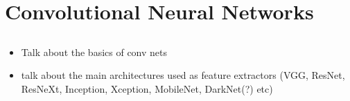 \chapter{Convolutional Neural Networks}
\label{chap:CNN}

\section{}
\begin{itemize}
 \item Talk about the basics of conv nets
 \item talk about the main architectures used as feature extractors (VGG, ResNet, ResNeXt, Inception, Xception, MobileNet, DarkNet(?) etc)
\end{itemize}
